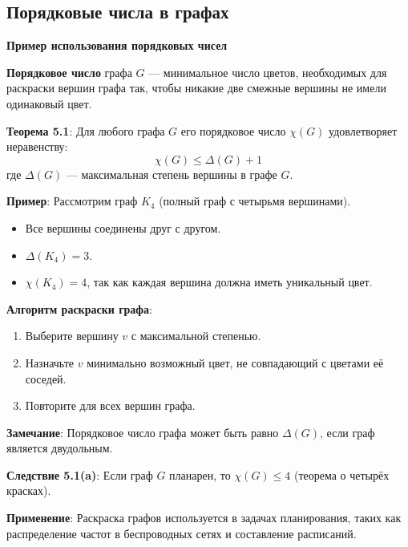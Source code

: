 \subsection{Порядковые числа в графах}

\noindent\textbf{Пример использования порядковых чисел}

\noindent\textbf{Порядковое число} графа $G$ — минимальное число цветов, необходимых для раскраски вершин графа так, чтобы никакие две смежные вершины не имели одинаковый цвет.

\noindent\textbf{Теорема 5.1}: Для любого графа $G$ его порядковое число $\chi(G)$ удовлетворяет неравенству:
\[
\chi(G) \leq \Delta(G) + 1
\]
где $\Delta(G)$ — максимальная степень вершины в графе $G$.

\noindent\textbf{Пример}: Рассмотрим граф $K_4$ (полный граф с четырьмя вершинами).
\begin{itemize}
    \item Все вершины соединены друг с другом.
    \item $\Delta(K_4) = 3$.
    \item $\chi(K_4) = 4$, так как каждая вершина должна иметь уникальный цвет.
\end{itemize}

\noindent\textbf{Алгоритм раскраски графа}:
\begin{enumerate}
    \item Выберите вершину $v$ с максимальной степенью.
    \item Назначьте $v$ минимально возможный цвет, не совпадающий с цветами её соседей.
    \item Повторите для всех вершин графа.
\end{enumerate}

\noindent\textbf{Замечание}: Порядковое число графа может быть равно $\Delta(G)$, если граф является двудольным.

\noindent\textbf{Следствие 5.1(a)}: Если граф $G$ планарен, то $\chi(G) \leq 4$ (теорема о четырёх красках).

\noindent\textbf{Применение}: Раскраска графов используется в задачах планирования, таких как распределение частот в беспроводных сетях и составление расписаний.